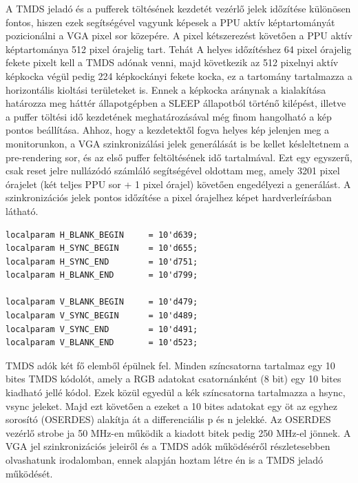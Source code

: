 	A TMDS jeladó és a pufferek töltésének kezdetét vezérlő jelek időzítése különösen fontos, hiszen ezek segítségével vagyunk képesek a PPU aktív képtartományát pozicionálni a VGA pixel sor közepére. A pixel kétszerezést követően a PPU aktív képtartománya 512 pixel órajelig tart. Tehát A helyes időzítéshez 64 pixel órajelig fekete pixelt kell a TMDS adónak venni, majd következik az 512 pixelnyi aktív képkocka végül pedig 224 képkockányi fekete kocka, ez a tartomány tartalmazza a horizontális kioltási területeket is. Ennek a képkocka aránynak a kialakítása határozza meg  háttér állapotgépben a SLEEP állapotból történő kilépést, illetve a puffer töltési idő kezdetének meghatározásával még finom hangolható a kép pontos beállítása. Ahhoz, hogy a kezdetektől fogva helyes kép jelenjen meg a monitorunkon, a VGA szinkronizálási jelek generálását is be kellet késleltetnem a pre-rendering sor, és az első puffer feltöltésének idő tartalmával. Ezt egy egyszerű, csak reset jelre nullázódó számláló segítségével oldottam meg, amely 3201 pixel órajelet (két teljes PPU sor + 1 pixel órajel) követően engedélyezi a generálást. A szinkronizációs jelek pontos időzítése a pixel órajelhez képet  hardverleírásban látható. 
	
\begin{lstlisting}[caption={A képgenerálás időzítési paraméterei}, label={code:vga-timing}, style=prettyverilog]
localparam H_BLANK_BEGIN     = 10'd639;
localparam H_SYNC_BEGIN      = 10'd655;
localparam H_SYNC_END        = 10'd751;
localparam H_BLANK_END       = 10'd799;

localparam V_BLANK_BEGIN     = 10'd479;
localparam V_SYNC_BEGIN      = 10'd489;
localparam V_SYNC_END        = 10'd491;
localparam V_BLANK_END       = 10'd523;\end{lstlisting}
	
	TMDS adók két fő elemből épülnek fel. Minden színcsatorna tartalmaz egy 10 bites TMDS kódolót, amely a RGB adatokat csatornánként (8 bit) egy 10 bites kiadható jellé kódol. Ezek közül egyedül a kék színcsatorna tartalmazza a hsync, vsync jeleket. Majd ezt követően a ezeket a 10 bites adatokat egy öt az egyhez sorosító (OSERDES) alakítja át a differenciális p és n jelekké. Az OSERDES vezérlő strobe ja 50 MHz-en működik a kiadott bitek pedig 250 MHz-el jönnek. A VGA jel szinkronizációs jeleiről és a TMDS adók működéséről részletesebben olvashatunk \citealp{vgalogsys} irodalomban, ennek alapján hoztam létre én is a TMDS jeladó működését.

